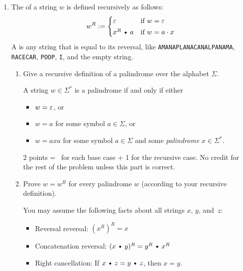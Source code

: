 \documentclass[11pt]{article}
\def\Cdot{\mathbin{\text{\normalfont \textbullet}}}
\def\Sym#1{\texttt{\color{BrickRed}#1}}
\begin{document}
\begin{enumerate}
\begin{enumerate}
\begin{rubric}
5 points: Standard induction rubric (scaled).  This is more detail than necessary for full credit.
\end{rubric}

\end{enumerate}

\newpage
\item
The  of a string $w$ is defined recursively as follows:
\[	
	w^R := \begin{cases}
		\e & \text{if $w=\e$} \\[0.5ex]
		x^R \Cdot a & \text{if $w=a\cdot x$}
	\end{cases}
\]
A  is any string that is equal to its reversal, like \Sym{AMANAPLANACANALPANAMA}, \hbox{\Sym{RACECAR}}, \Sym{POOP}, \Sym{I}, and the empty string.

\begin{enumerate}
\item
Give a recursive definition of a palindrome over the alphabet $\Sigma$.

\begin{Solution}
A string $w\in\Sigma^*$ is a palindrome if and only if either
\begin{itemize}
\item $w = \varepsilon$, or
\item $w = a$ for some symbol $a\in\Sigma$, or
\item $w = axa$ for some symbol $a\in\Sigma$ and some \emph{palindrome} $x\in\Sigma^*$.
\end{itemize}
\end{Solution}
\unskip
\begin{rubric}
2 points = \textonehalf\ for each base case + 1 for the recursive case.
No credit for the rest of the problem unless this part is correct.
\end{rubric}

\item
Prove $w = w^R$ for every palindrome $w$ (according to your recursive definition).  

You may assume the following facts about all strings $x$, $y$, and~$z$:
\begin{itemize}
\item Reversal reversal: $(x^R)^R = x$
\item Concatenation reversal: $(x\Cdot y)^R = y^R\Cdot x^R$
\item Right cancellation:  If $x\Cdot z = y\Cdot z$, then $x = y$.
\end{itemize}



\end{enumerate}
\end{enumerate}
\end{document}
